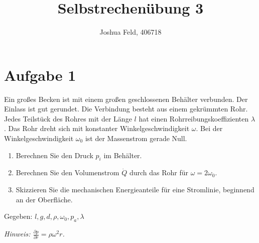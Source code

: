 \documentclass{exercise}
\institute{Lehrstuhl für Strömungslehre und Aerodynamisches Institut}
\title{Selbstrechenübung 3}
\author{Joshua Feld, 406718}
\begin{document}
    \maketitle


    \section*{Aufgabe 1}
    
    \begin{problem}
        Ein großes Becken ist mit einem großen geschlossenen Behälter verbunden.
        Der Einlass ist gut gerundet.
        Die Verbindung besteht aus einem gekrümmten Rohr.
        Jedes Teilstück des Rohres mit der Länge \(l\) hat einen Rohrreibungskoeffizienten \(\lambda\).
        Das Rohr dreht sich mit konstanter Winkelgeschwindigkeit \(\omega\).
        Bei der Winkelgeschwindigkeit \(\omega_0\) ist der Massenstrom gerade Null.
        \begin{enumerate}
            \item Berechnen Sie den Druck \(p_i\) im Behälter.
            \item Berechnen Sie den Volumenstrom \(\dot{Q}\) durch das Rohr für \(\omega = 2\omega_0\).
            \item Skizzieren Sie die mechanischen Energieanteile für eine Stromlinie, beginnend an der Oberfläche.
        \end{enumerate}
        Gegeben: \(l, g, d, \rho, \omega_0, p_a, \lambda\)
        
        \emph{Hinweis: \(\frac{\partial p}{\partial r} = \rho\omega^2 r\).}
    \end{problem}
    
\end{document}
